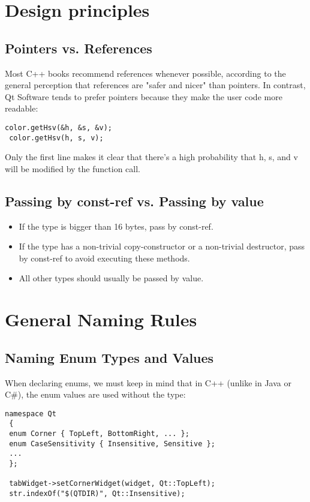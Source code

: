 \documentclass[a4paper,12pt]{article}
\begin{document}
\clearpage
\newpage

\section{Design principles}\label{sec:design}
\subsection{Pointers vs. References}
Most C++ books recommend references whenever possible, according to the general perception that references are "safer and nicer" than pointers. In contrast, Qt Software tends to prefer pointers because they make the user code more readable:
\begin{lstlisting}[breaklines]
 color.getHsv(&h, &s, &v);
 color.getHsv(h, s, v);
 \end{lstlisting}
Only the first line makes it clear that there's a high probability that h, s, and v will be modified by the function call.

\subsection{Passing by const-ref vs. Passing by value}
\begin{itemize}
\item If the type is bigger than 16 bytes, pass by const-ref.
\item If the type has a non-trivial copy-constructor or a non-trivial destructor, pass by const-ref to avoid executing these methods.
\item All other types should usually be passed by value.
\end{itemize}


\clearpage
\newpage

\section{General Naming Rules}\label{sec:naming_rules}
\subsection{Naming Enum Types and Values}
When declaring enums, we must keep in mind that in C++ (unlike in Java or C\#), the enum values are used without the type:
\begin{lstlisting}[breaklines]
 namespace Qt
 {
 enum Corner { TopLeft, BottomRight, ... };
 enum CaseSensitivity { Insensitive, Sensitive };
 ...
 };
 
 tabWidget->setCornerWidget(widget, Qt::TopLeft);
 str.indexOf("$(QTDIR)", Qt::Insensitive);
 \end{lstlisting}
\end{document}
